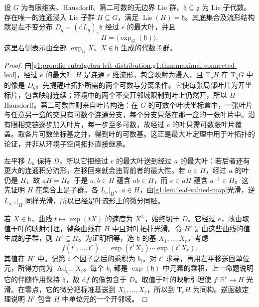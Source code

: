 \begin{theorem}\label{g1:thm:lie-subalgebra-integration}
	设 \(G\) 为有限维实、Hausdorff、第二可数的无边界 Lie 群，\(\mathfrak h\subseteq\mathfrak g\) 为 Lie 子代数。存在唯一的连通浸入 Lie 子群 \(H\subseteq G\)，满足 \(\operatorname{Lie}(H)=\mathfrak h\)。其底集合及流形结构就是左不变分布 \(D_g=(\mathrm{d}L_g)_e\mathfrak h\) 经过 \(e\) 的最大叶，并且
	\begin{equation}\label{g1:eq:integral-subgroup-generated-exponentials}
		H=\langle\exp_G(\mathfrak h)\rangle.
	\end{equation}
	这里右侧表示由全部 \(\exp_G X\)、\(X\in\mathfrak h\) 生成的代数子群。
\end{theorem}
\begin{proof}
	由\cref{g1:prop:lie-subalgebra-left-distribution,g1:thm:maximal-connected-leaf}，经过 \(e\) 的最大叶 \(H\) 是连通 \(r\) 维流形，包含映射为浸入，且 \(\mathrm{T}_gH\) 在 \(\mathrm{T}_gG\) 中的像是 \(D_g\)。先提醒叶拓扑所需的两个可数与分离条件。它使每张局部叶片为开坐标片，包含映射连续；环境中的两个不交开邻域限制到叶上仍然开，所以 \(H\) Hausdorff。第二可数性则来自叶片构造：在 \(G\) 的可数个叶状坐标盒中，一张叶片与任意另一盒的交只有可数个连通分支，每个分支只落在那一盒的一张叶片中。沿有限相交链逐步加入叶片，每一步至多可数，故经过 \(e\) 的叶只需可数张叶片覆盖。取各片可数坐标基之并，得到叶的可数基。这正是最大叶定理中用于叶拓扑的论证，并非从环境子空间拓扑直接继承。

	左平移 \(L_a\) 保持 \(D\)，所以它把经过 \(e\) 的最大叶送到经过 \(a\) 的最大叶：若后者还有更大的连通积分流形，左移回来就会违背前者的最大性。若 \(a\in H\)，经过 \(a\) 的叶仍是 \(H\)，故 \(aH=H\)。于是 \(a,b\in H\) 蕴含 \(ab\in H\)，而 \(e\in aH\) 蕴含 \(a^{-1}\in H\)。这先证明 \(H\) 在集合上是子群。各 \(L_a|_H\)、\(a\in H\)，由\cref{g1:lem:leaf-valued-map}光滑，逆 \(L_{a^{-1}}|_H\) 同样光滑，所以已经是叶流形上的微分同胚。

	若 \(X\in\mathfrak h\)，曲线 \(t\mapsto\exp(tX)\) 的速度为 \(X^L\)，始终切于 \(D\)。它经过 \(e\)，故由取值于叶的映射引理，整条曲线在 \(H\) 中且对叶拓扑光滑。令 \(H'\) 是由这些曲线的值生成的子群，则 \(H'\subseteq H\)。为证明相等，选 \(\mathfrak h\) 的基 \(X_1,\ldots,X_r\)，考虑
	\[
		f(t^1,\ldots,t^r)=\exp(t^1X_1)\cdots\exp(t^rX_r).
	\]
	其值在 \(H'\) 中。记第 \(i\) 个因子之后的乘积为 \(b_i\)。对 \(t^i\) 求导，再用左平移送回单位元，所得方向为 \(\operatorname{Ad}_{b_i^{-1}}X_i\)。每个 \(b_i\) 都是 \(\exp(\mathfrak h)\) 中元素的乘积，上一命题说明它的伴随作用保持 \(\mathfrak h\)，故 \(\mathrm{d}f\) 的像包含于 \(D\)。取值于叶的映射引理使 \(f:\mathbb R^r\to H\) 光滑。在零点，它的微分把标准基送到 \(X_1,\ldots,X_r\)，所以到 \(\mathrm{T}_eH\) 为同构。逆函数定理说明 \(H'\) 包含 \(H\) 中单位元的一个开邻域。


\end{proof}
